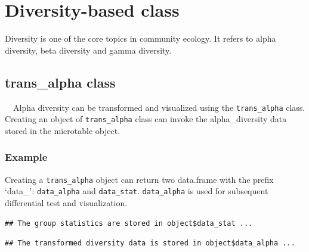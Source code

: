 \documentclass[
]{book}
\newenvironment{Shaded}{\begin{snugshade}}{\end{snugshade}}
\newcommand{\AttributeTok}[1]{\textcolor[rgb]{0.13,0.29,0.53}{#1}}
\newcommand{\CommentTok}[1]{\textcolor[rgb]{0.56,0.35,0.01}{\textit{#1}}}
\newcommand{\FunctionTok}[1]{\textcolor[rgb]{0.13,0.29,0.53}{\textbf{#1}}}
\newcommand{\NormalTok}[1]{#1}
\newcommand{\OtherTok}[1]{\textcolor[rgb]{0.56,0.35,0.01}{#1}}
\newcommand{\SpecialCharTok}[1]{\textcolor[rgb]{0.81,0.36,0.00}{\textbf{#1}}}
\newcommand{\StringTok}[1]{\textcolor[rgb]{0.31,0.60,0.02}{#1}}
\begin{document}
\chapter{Diversity-based class}\label{diversity-based-class}

Diversity is one of the core topics in community ecology.
It refers to alpha diversity, beta diversity and gamma diversity.

\section{trans\_alpha class}\label{trans_alpha-class}

　Alpha diversity can be transformed and visualized using the \texttt{trans\_alpha} class.
Creating an object of \texttt{trans\_alpha} class can invoke the alpha\_diversity data stored in the microtable object.

\subsection{Example}\label{example-2}

Creating a \texttt{trans\_alpha} object can return two data.frame with the prefix `data\_': \texttt{data\_alpha} and \texttt{data\_stat}.
\texttt{data\_alpha} is used for subsequent differential test and visualization.

\begin{Shaded}
\end{Shaded}

\begin{verbatim}
## The group statistics are stored in object$data_stat ...
\end{verbatim}

\begin{verbatim}
## The transformed diversity data is stored in object$data_alpha ...
\end{verbatim}
\end{document}
